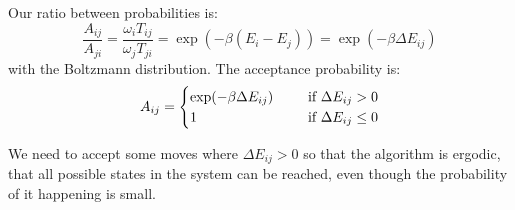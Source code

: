 Our ratio between probabilities is:
\[
\frac{A_{ij}}{A_{ji}} = \frac{\omega_iT_{ij}}{\omega_jT_{ji}} = \exp(-\beta (E_i-E_j))= \exp(-\beta \Delta E_{ij})
\]
with the Boltzmann distribution. The acceptance probability is:
\begin{equation}\label{eq:acceptance}
A_{ij} = \begin{cases}
\exp(-\beta \Delta E_{ij}) &\indent \text{if } \Delta E_{ij} > 0\\
1 & \indent\text{if } \Delta E_{ij} \leq 0\\
\end{cases}
\end{equation}

We need to accept some moves where $\Delta E_{ij} > 0$ so that the algorithm is ergodic, that all possible states in the system can be reached, even though the probability of it happening is small.

